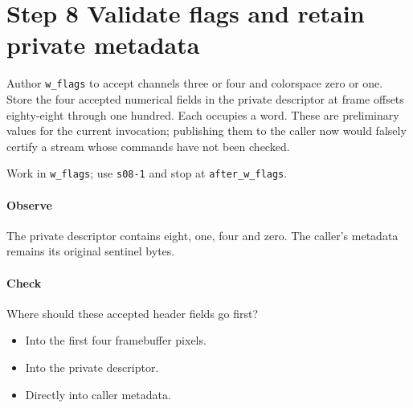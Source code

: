 \section{Step 8 Validate flags and retain private metadata}\label{qoi-s08}
Author \texttt{w\_flags} to accept channels three or four and colorspace zero or one. Store the four accepted numerical fields in the private descriptor at frame offsets eighty-eight through one hundred. Each occupies a word. These are preliminary values for the current invocation; publishing them to the caller now would falsely certify a stream whose commands have not been checked.

Work in \texttt{w\_flags}; use \texttt{s08-1} and stop at \texttt{after\_w\_flags}.

\paragraph{Observe} The private descriptor contains eight, one, four and zero. The caller’s metadata remains its original sentinel bytes.

\paragraph{Check} Where should these accepted header fields go first?
\begin{itemize}
\item[A.] Into the first four framebuffer pixels.
\item[B.] Into the private descriptor.
\item[C.] Directly into caller metadata.
\end{itemize}
